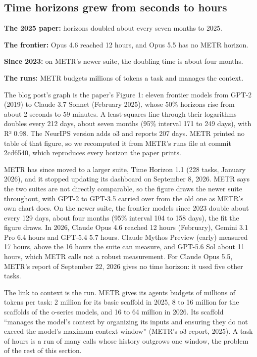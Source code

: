 \subsection{Time horizons grew from seconds to hours}
\label{sec:it-8-0b}

\bi
\item \textbf{The 2025 paper:} horizons doubled about every seven months to 2025.
\item \textbf{The frontier:} Opus 4.6 reached 12 hours, and Opus 5.5 has no METR horizon.
\item \textbf{Since 2023:} on METR's newer suite, the doubling time is about four months.
\item \textbf{The runs:} METR budgets millions of tokens a task and manages the context.
\ei

The blog post's graph is the paper's Figure 1: eleven frontier models from GPT-2 (2019) to Claude 3.7 Sonnet (February 2025), whose 50\% horizons rise from about 2 seconds to 59 minutes. A least-squares line through their logarithms doubles every 212 days, about seven months (95\% interval 171 to 249 days), with R² 0.98. The NeurIPS version adds o3 and reports 207 days. METR printed no table of that figure, so we recomputed it from METR's runs file at commit 2cd6540, which reproduces every horizon the paper prints.

METR has since moved to a larger suite, Time Horizon 1.1 (228 tasks, January 2026), and it stopped updating its dashboard on September 8, 2026. METR says the two suites are not directly comparable, so the figure draws the newer suite throughout, with GPT-2 to GPT-3.5 carried over from the old one as METR's own chart does. On the newer suite, the frontier models since 2023 double about every 129 days, about four months (95\% interval 104 to 158 days), the fit the figure draws. In 2026, Claude Opus 4.6 reached 12 hours (February), Gemini 3.1 Pro 6.4 hours and GPT-5.4 5.7 hours. Claude Mythos Preview (early) measured 17 hours, above the 16 hours the suite can measure, and GPT-5.6 Sol about 11 hours, which METR calls not a robust measurement. For Claude Opus 5.5, METR's report of September 22, 2026 gives no time horizon: it used five other tasks.

The link to context is the run. METR gives its agents budgets of millions of tokens per task: 2 million for its basic scaffold in 2025, 8 to 16 million for the scaffolds of the o-series models, and 16 to 64 million in 2026. Its scaffold ``manages the model's context by organizing its inputs and ensuring they do not exceed the model's maximum context window'' (METR's o3 report, 2025). A task of hours is a run of many calls whose history outgrows one window, the problem of the rest of this section.


